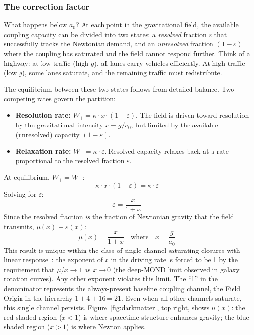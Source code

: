 \documentclass[aps,prd,preprint,superscriptaddress,showpacs,preprintnumbers,amsmath,amssymb,nofootinbib]{revtex4-2}
\begin{document}
\subsubsection*{The correction factor}

What happens below $a_0$? At each point in the gravitational field, the available coupling capacity can be divided into two states: a \emph{resolved} fraction $\varepsilon$ that successfully tracks the Newtonian demand, and an \emph{unresolved} fraction $(1 - \varepsilon)$ where the coupling has saturated and the field cannot respond further. Think of a highway: at low traffic (high $g$), all lanes carry vehicles efficiently. At high traffic (low $g$), some lanes saturate, and the remaining traffic must redistribute.

The equilibrium between these two states follows from detailed balance. Two competing rates govern the partition:
\begin{itemize}
\item \textbf{Resolution rate:} $W_+ = \kappa \cdot x \cdot (1 - \varepsilon)$. The field is driven toward resolution by the gravitational intensity $x = g/a_0$, but limited by the available (unresolved) capacity $(1 - \varepsilon)$.
\item \textbf{Relaxation rate:} $W_- = \kappa \cdot \varepsilon$. Resolved capacity relaxes back at a rate proportional to the resolved fraction $\varepsilon$.
\end{itemize}
At equilibrium, $W_+ = W_-$:
\begin{equation}
\kappa \cdot x \cdot (1 - \varepsilon) = \kappa \cdot \varepsilon
\end{equation}
Solving for $\varepsilon$:
\begin{equation}
\varepsilon = \frac{x}{1 + x}
\end{equation}
Since the resolved fraction \emph{is} the fraction of Newtonian gravity that the field transmits, $\mu(x) \equiv \varepsilon(x)$:
\begin{equation}
\mu(x) = \frac{x}{1+x} \quad \text{where} \quad x = \frac{g}{a_0}
\label{eq:mu-dm}
\end{equation}
This result is unique within the class of single-channel saturating closures with linear response~\cite{paper1}: the exponent of $x$ in the driving rate is forced to be 1 by the requirement that $\mu/x \to 1$ as $x \to 0$ (the deep-MOND limit observed in galaxy rotation curves). Any other exponent violates this limit. The ``1'' in the denominator represents the always-present baseline coupling channel, the Field Origin in the hierarchy $1 + 4 + 16 = 21$. Even when all other channels saturate, this single channel persists. Figure~\ref{fig:darkmatter}, top right, shows $\mu(x)$: the red shaded region ($x < 1$) is where spacetime structure enhances gravity; the blue shaded region ($x > 1$) is where Newton applies.
\end{document}
